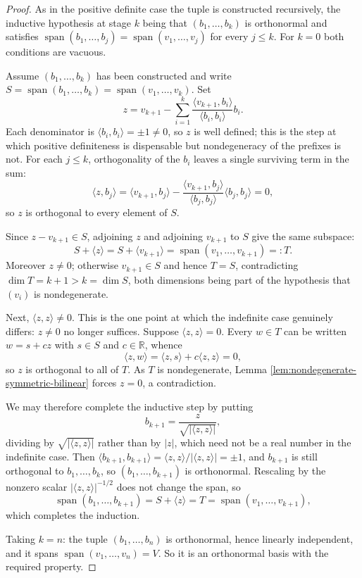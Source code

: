 \begin{proof}
\leanok
{}
As in the positive definite case the tuple is constructed recursively, the inductive hypothesis at stage $k$ being that $(b_1,\ldots,b_k)$ is orthonormal and satisfies $\operatorname{span}(b_1,\ldots,b_j) = \operatorname{span}(v_1,\ldots,v_j)$ for every $j \leq k$. For $k = 0$ both conditions are vacuous.

Assume $(b_1,\ldots,b_k)$ has been constructed and write $S = \operatorname{span}(b_1,\ldots,b_k) = \operatorname{span}(v_1,\ldots,v_k)$. Set
\[
z = v_{k+1} - \sum_{i=1}^k \frac{\langle v_{k+1}, b_i \rangle}{\langle b_i, b_i \rangle} b_i.
\]
Each denominator is $\langle b_i, b_i \rangle = \pm 1 \neq 0$, so $z$ is well defined; this is the step at which positive definiteness is dispensable but nondegeneracy of the prefixes is not. For each $j \leq k$, orthogonality of the $b_i$ leaves a single surviving term in the sum:
\[
\langle z, b_j \rangle = \langle v_{k+1}, b_j \rangle - \frac{\langle v_{k+1}, b_j \rangle}{\langle b_j, b_j \rangle}\langle b_j, b_j \rangle = 0,
\]
so $z$ is orthogonal to every element of $S$.

Since $z - v_{k+1} \in S$, adjoining $z$ and adjoining $v_{k+1}$ to $S$ give the same subspace:
\[
S + \langle z \rangle = S + \langle v_{k+1} \rangle = \operatorname{span}(v_1,\ldots,v_{k+1}) =: T .
\]
Moreover $z \neq 0$; otherwise $v_{k+1} \in S$ and hence $T = S$, contradicting $\dim T = k+1 > k = \dim S$, both dimensions being part of the hypothesis that $(v_i)$ is nondegenerate.

Next, $\langle z, z \rangle \neq 0$. This is the one point at which the indefinite case genuinely differs: $z \neq 0$ no longer suffices. Suppose $\langle z,z\rangle = 0$. Every $w \in T$ can be written $w = s + cz$ with $s \in S$ and $c \in \mathbb{R}$, whence
\[
\langle z, w \rangle = \langle z, s \rangle + c\langle z, z \rangle = 0 ,
\]
so $z$ is orthogonal to all of $T$. As $T$ is nondegenerate, Lemma \ref{lem:nondegenerate-symmetric-bilinear} forces $z = 0$, a contradiction.

We may therefore complete the inductive step by putting
\[
b_{k+1} = \frac{z}{\sqrt{|\langle z, z \rangle|}} ,
\]
dividing by $\sqrt{|\langle z,z\rangle|}$ rather than by $|z|$, which need not be a real number in the indefinite case. Then $\langle b_{k+1}, b_{k+1} \rangle = \langle z,z\rangle/|\langle z,z\rangle| = \pm 1$, and $b_{k+1}$ is still orthogonal to $b_1,\ldots,b_k$, so $(b_1,\ldots,b_{k+1})$ is orthonormal. Rescaling by the nonzero scalar $|\langle z,z\rangle|^{-1/2}$ does not change the span, so
\[
\operatorname{span}(b_1,\ldots,b_{k+1}) = S + \langle z \rangle = T = \operatorname{span}(v_1,\ldots,v_{k+1}),
\]
which completes the induction.

Taking $k = n$: the tuple $(b_1,\ldots,b_n)$ is orthonormal, hence linearly independent, and it spans $\operatorname{span}(v_1,\ldots,v_n) = V$. So it is an orthonormal basis with the required property.
\end{proof}

